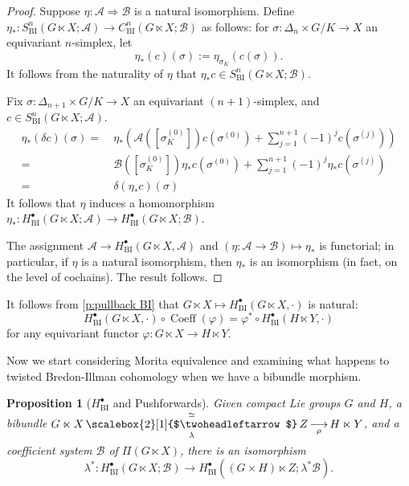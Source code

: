 \documentclass[12pt,reqno]{amsart}
\newcommand{\printname}[1]{}
\renewcommand{\printname}[1]
	{{\color{brown}{\makebox[0pt]{\hspace{-1in}\raisebox{8pt}{\tiny #1}}}}}
\newcommand{\labell}[1]{\label{#1} \printname{#1}}
\newcommand{\calA}{{\mathcal{A}}}
\newcommand{\calB}{{\mathcal{B}}}
\newcommand{\ot}[1]{{\,\underset{\raisebox{1mm}{$\scriptstyle{#1}$}}{\overset{\simeq}{\scalebox{2}[1]{$\twoheadleftarrow$}}}\,}} %
\newcommand{\uto}[1]{{\,\underset{\raisebox{1mm}{$\scriptstyle{#1}$}}{\longrightarrow}\,}} %
\theoremstyle{plain}
\newtheorem{proposition}[theorem]{Proposition}
\theoremstyle{definition}
\newcommand{\BI}{{\operatorname{BI}}} %
\newcommand{\Coeff}{{\operatorname{Coeff}}} %
\begin{document}
    \begin{proof}
        Suppose $\eta\colon\calA\Rightarrow\calB$ is a natural isomorphism.  Define $\eta_*\colon S_\BI^n(G\ltimes X;\calA)\to C_\BI^n(G\ltimes X;\calB)$ as follows: for $\sigma\colon\Delta_n\times G/K\to X$ an equivariant $n$-simplex, let $$\eta_*(c)(\sigma):=\eta_{\sigma_K}(c(\sigma)).$$  It follows from the naturality of $\eta$ that $\eta_*c\in S_\BI^n(G\ltimes X;\calB)$. 

        Fix $\sigma\colon\Delta_{n+1}\times G/K\to X$ an equivariant $(n+1)$-simplex, and $c\in S_\BI^n(G\ltimes X;\calA)$.
        \begin{align*}
            \eta_*(\delta c)(\sigma)  =&~ \eta_*\left(\calA([\sigma_K^{(0)}])c(\sigma^{(0)})+\sum_{j=1}^{n+1}(-1)^jc(\sigma^{(j)})\right) \\
                =&~ \calB([\sigma_K^{(0)}])\eta_*c(\sigma^{(0)})+\sum_{j=1}^{n+1}(-1)^j\eta_*c(\sigma^{(j)}) \\
                =&~ \delta(\eta_*c)(\sigma)
        \end{align*}
        It follows that $\eta$ induces a homomorphism $\eta_*\colon H_\BI^\bullet(G\ltimes X;\calA)\to H_\BI^\bullet(G\ltimes X;\calB).$  

        The assignment $\calA\to H^\bullet_\BI(G\ltimes X,\calA)$ and $(\eta\colon\calA\to\calB)\mapsto\eta_*$ is functorial; in particular, if $\eta$ is a natural isomorphism, then $\eta_*$ is an isomorphism (in fact, on the level of cochains).  The result follows.
    \end{proof}

It follows from \cref{p:pullback BI} that $G\ltimes X\mapsto H^\bullet_\BI(G\ltimes X,\cdot)$ is natural: $$H^\bullet_\BI(G\ltimes X,\cdot)\circ\Coeff(\varphi)=\varphi^*\circ H^\bullet_\BI(H\ltimes Y,\cdot)$$ for any equivariant functor $\varphi\colon G\ltimes X\to H\ltimes Y$.

Now we start considering Morita equivalence  and examining what happens to twisted Bredon-Illman cohomology when we have a bibundle morphism.  
    
    \begin{proposition}[$H^\bullet_\BI$ and Pushforwards]\labell{p:pushforward BI}
        Given compact Lie groups $G$ and $H$, a bibundle $G\ltimes X\ot{\lambda} Z\uto{\rho} H\ltimes Y$, and a coefficient system $\calB$ of $\Pi(G\ltimes X)$, there is an isomorphism $$\lambda^*\colon H_\BI^\bullet(G\ltimes X;\calB)\to H_\BI^\bullet((G\times H)\ltimes Z;\lambda^*\calB).$$
    \end{proposition}
\end{document}
